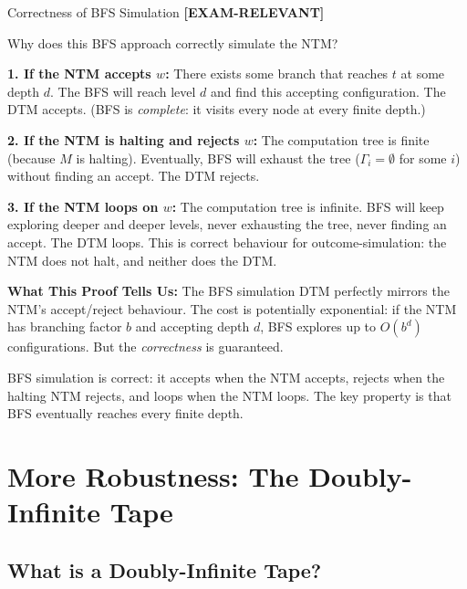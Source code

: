 \documentclass[11pt,a4paper]{article}
\newcommand{\kemark}{\textcolor{red!70!black}{\textbf{[EXAM-RELEVANT]}}}
\newcommand{\kt}[1]{\par\vspace{0.3em}\colorbox{yellow!60}{\parbox{\dimexpr\linewidth-2\fboxsep}{#1}}\vspace{0.3em}}
\begin{document}
\begin{conceptbox}{Correctness of BFS Simulation \kemark}

Why does this BFS approach correctly simulate the NTM?

\textbf{1. If the NTM accepts $w$:}
There exists some branch that reaches $t$ at some depth $d$. The BFS will reach level $d$ and find this accepting configuration. The DTM accepts. (BFS is \textit{complete}: it visits every node at every finite depth.)

\textbf{2. If the NTM is halting and rejects $w$:}
The computation tree is finite (because $M$ is halting). Eventually, BFS will exhaust the tree ($\Gamma_i = \emptyset$ for some $i$) without finding an accept. The DTM rejects.

\textbf{3. If the NTM loops on $w$:}
The computation tree is infinite. BFS will keep exploring deeper and deeper levels, never exhausting the tree, never finding an accept. The DTM loops. This is correct behaviour for outcome-simulation: the NTM does not halt, and neither does the DTM.

\textbf{What This Proof Tells Us:}
The BFS simulation DTM perfectly mirrors the NTM's accept/reject behaviour. The cost is potentially exponential: if the NTM has branching factor $b$ and accepting depth $d$, BFS explores up to $O(b^d)$ configurations. But the \textit{correctness} is guaranteed.

\kt{BFS simulation is correct: it accepts when the NTM accepts, rejects when the halting NTM rejects, and loops when the NTM loops. The key property is that BFS eventually reaches every finite depth.}
\end{conceptbox}

\newpage

\section{More Robustness: The Doubly-Infinite Tape}

\subsection{What is a Doubly-Infinite Tape?}
\end{document}
